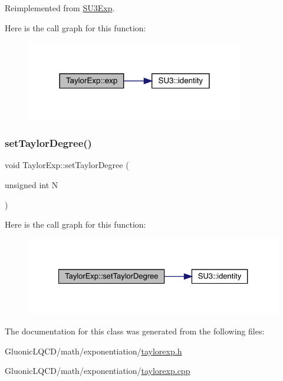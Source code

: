 Reimplemented from \mbox{\hyperlink{class_s_u3_exp_a9760c17b9c3a4b6d0a5cd4d88c6d577e}{S\+U3\+Exp}}.

Here is the call graph for this function\+:\nopagebreak
\begin{figure}[H]
\begin{center}
\leavevmode
\includegraphics[width=270pt]{class_taylor_exp_a622c4af7d88a43a7bcda97722b62fc82_cgraph}
\end{center}
\end{figure}
\mbox{\label{class_taylor_exp_a6a048363483f372300e412b27f218773}} 
\subsubsection{\texorpdfstring{setTaylorDegree()}{setTaylorDegree()}}
{\footnotesize\ttfamily void Taylor\+Exp\+::set\+Taylor\+Degree (\begin{DoxyParamCaption}\item[{unsigned int}]{N }\end{DoxyParamCaption})}

Here is the call graph for this function\+:\nopagebreak
\begin{figure}[H]
\begin{center}
\leavevmode
\includegraphics[width=327pt]{class_taylor_exp_a6a048363483f372300e412b27f218773_cgraph}
\end{center}
\end{figure}


The documentation for this class was generated from the following files\+:\begin{DoxyCompactItemize}
\item 
Gluonic\+L\+Q\+C\+D/math/exponentiation/\mbox{\hyperlink{taylorexp_8h}{taylorexp.\+h}}\item 
Gluonic\+L\+Q\+C\+D/math/exponentiation/\mbox{\hyperlink{taylorexp_8cpp}{taylorexp.\+cpp}}\end{DoxyCompactItemize}
